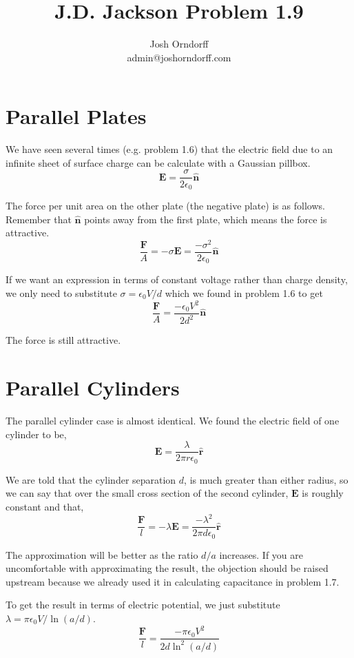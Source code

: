 \documentclass[10pt,a4paper]{article}
\begin{document}
\title{J.D. Jackson Problem 1.9}
\author{Josh Orndorff \\ admin@joshorndorff.com}
\maketitle

\section{Parallel Plates}
We have seen several times (e.g. problem 1.6) that the electric field due to an infinite sheet of surface charge can be calculate with a Gaussian pillbox.
\begin{equation}
\mathbf{E}=\frac{\sigma}{2\epsilon_0}\mathbf{\hat{n}}
\end{equation}

The force per unit area on the other plate (the negative plate) is as follows. Remember that $\mathbf{\hat{n}}$ points away from the first plate, which means the force is attractive.
\begin{equation}
\frac{\mathbf{F}}{A}=-\sigma \mathbf{E} = \frac{-\sigma^2}{2\epsilon_0}\mathbf{\hat{n}}
\end{equation}

If we want an expression in terms of constant voltage rather than charge density, we only need to substitute $\sigma=\epsilon_0 V / d$ which we found in problem 1.6 to get
\begin{equation}
\frac{\mathbf{F}}{A}=\frac{-\epsilon_0 V^2}{2d^2}\mathbf{\hat{n}}
\end{equation}

The force is still attractive.

\section{Parallel Cylinders}
The parallel cylinder case is almost identical. We found the electric field of one cylinder to be,
\begin{equation}
\mathbf{E}=\frac{\lambda}{2\pi r\epsilon_0}\mathbf{\hat{r}}
\end{equation}

We are told that the cylinder separation $d$, is much greater than either radius, so we can say that over the small cross section of the second cylinder, $\mathbf{E}$ is roughly constant and that,
\begin{equation}
\frac{\mathbf{F}}{l}=-\lambda\mathbf{E}=\frac{-\lambda^2}{2\pi d \epsilon_0}\mathbf{\hat{r}}
\end{equation}

The approximation will be better as the ratio $d/a$ increases. If you are uncomfortable with approximating the result, the objection should be raised upstream because we already used it in calculating capacitance in problem 1.7.

To get the result in terms of electric potential, we just substitute $\lambda = \pi\epsilon_0 V/\ln(a/d)$.
\begin{equation}
\frac{\mathbf{F}}{l}=\frac{-\pi\epsilon_0 V^2}{2d\ln^2(a/d)}
\end{equation}
\end{document}
